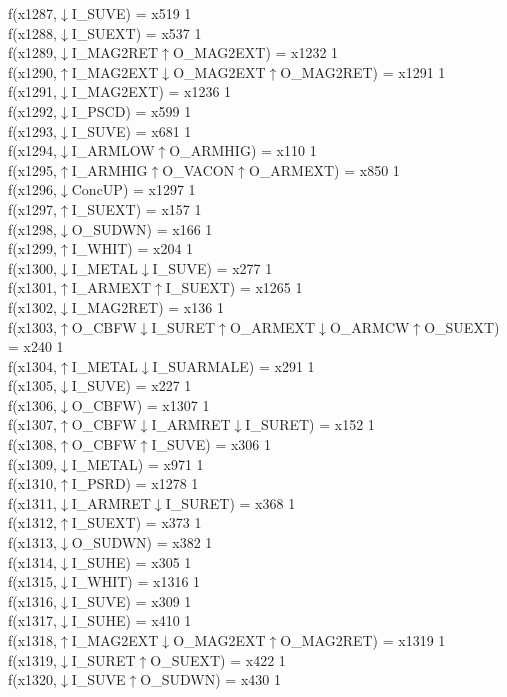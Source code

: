 f(x1287,$\downarrow$I\_SUVE) = x519 {1} \\
f(x1288,$\downarrow$I\_SUEXT) = x537 {1} \\
f(x1289,$\downarrow$I\_MAG2RET$\uparrow$O\_MAG2EXT) = x1232 {1} \\
f(x1290,$\uparrow$I\_MAG2EXT$\downarrow$O\_MAG2EXT$\uparrow$O\_MAG2RET) = x1291 {1} \\
f(x1291,$\downarrow$I\_MAG2EXT) = x1236 {1} \\
f(x1292,$\downarrow$I\_PSCD) = x599 {1} \\
f(x1293,$\downarrow$I\_SUVE) = x681 {1} \\
f(x1294,$\downarrow$I\_ARMLOW$\uparrow$O\_ARMHIG) = x110 {1} \\
f(x1295,$\uparrow$I\_ARMHIG$\uparrow$O\_VACON$\uparrow$O\_ARMEXT) = x850 {1} \\
f(x1296,$\downarrow$ConcUP) = x1297 {1} \\
f(x1297,$\uparrow$I\_SUEXT) = x157 {1} \\
f(x1298,$\downarrow$O\_SUDWN) = x166 {1} \\
f(x1299,$\uparrow$I\_WHIT) = x204 {1} \\
f(x1300,$\downarrow$I\_METAL$\downarrow$I\_SUVE) = x277 {1} \\
f(x1301,$\uparrow$I\_ARMEXT$\uparrow$I\_SUEXT) = x1265 {1} \\
f(x1302,$\downarrow$I\_MAG2RET) = x136 {1} \\
f(x1303,$\uparrow$O\_CBFW$\downarrow$I\_SURET$\uparrow$O\_ARMEXT$\downarrow$O\_ARMCW$\uparrow$O\_SUEXT) = x240 {1} \\
f(x1304,$\uparrow$I\_METAL$\downarrow$I\_SUARMALE) = x291 {1} \\
f(x1305,$\downarrow$I\_SUVE) = x227 {1} \\
f(x1306,$\downarrow$O\_CBFW) = x1307 {1} \\
f(x1307,$\uparrow$O\_CBFW$\downarrow$I\_ARMRET$\downarrow$I\_SURET) = x152 {1} \\
f(x1308,$\uparrow$O\_CBFW$\uparrow$I\_SUVE) = x306 {1} \\
f(x1309,$\downarrow$I\_METAL) = x971 {1} \\
f(x1310,$\uparrow$I\_PSRD) = x1278 {1} \\
f(x1311,$\downarrow$I\_ARMRET$\downarrow$I\_SURET) = x368 {1} \\
f(x1312,$\uparrow$I\_SUEXT) = x373 {1} \\
f(x1313,$\downarrow$O\_SUDWN) = x382 {1} \\
f(x1314,$\downarrow$I\_SUHE) = x305 {1} \\
f(x1315,$\downarrow$I\_WHIT) = x1316 {1} \\
f(x1316,$\downarrow$I\_SUVE) = x309 {1} \\
f(x1317,$\downarrow$I\_SUHE) = x410 {1} \\
f(x1318,$\uparrow$I\_MAG2EXT$\downarrow$O\_MAG2EXT$\uparrow$O\_MAG2RET) = x1319 {1} \\
f(x1319,$\downarrow$I\_SURET$\uparrow$O\_SUEXT) = x422 {1} \\
f(x1320,$\downarrow$I\_SUVE$\uparrow$O\_SUDWN) = x430 {1} \\
